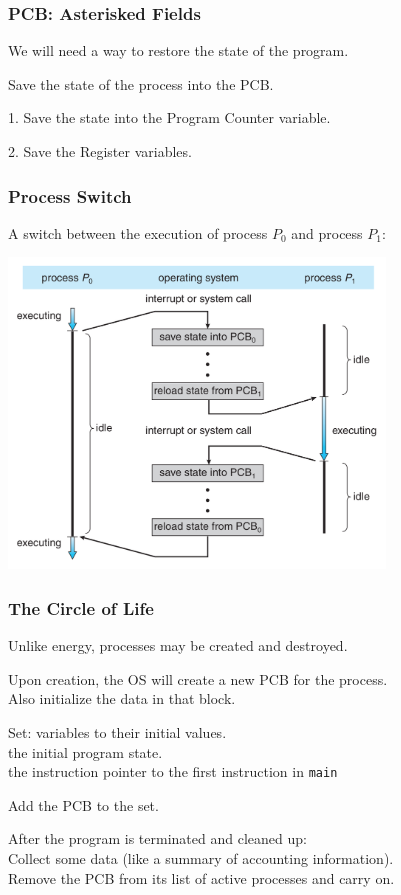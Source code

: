 \begin{frame}
	\frametitle{PCB: Asterisked Fields}
	We will need a way to restore the state of the program.

	Save the state of the process into the PCB.

	1. Save the state into the Program Counter variable.

	2. Save the Register variables.

\end{frame}

\begin{frame}
	\frametitle{Process Switch}

	A switch between the execution of process $P_{0}$ and process $P_{1}$:

	\begin{center}
		\includegraphics[width=0.75\textwidth]{images/process-switch.png}
	\end{center}

\end{frame}


\begin{frame}
	\frametitle{The Circle of Life}


	Unlike energy, processes may be created and destroyed.

	Upon creation, the OS will create a new PCB for the process.\\
	\quad Also initialize the data in that block.

	Set: variables to their initial values.\\
	\quad the initial program state.\\
	\quad the instruction pointer to the first instruction in \texttt{main}

	Add the PCB to the set.

	After the program is terminated and cleaned up:\\
	\quad Collect some data (like a summary of accounting information).\\
	\quad Remove the PCB from its list of active processes and carry on.


\end{frame}

